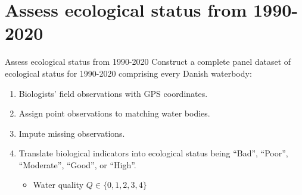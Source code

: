 \section{Assess ecological status from 1990-2020}

\begin{frame}{Assess ecological status from 1990-2020}
  Construct a complete panel dataset of ecological status for 1990-2020 comprising every Danish waterbody\pause:
  \begin{enumerate}
    \item Biologists' field observations with GPS coordinates.
    \pause
    \item Assign point observations to matching water bodies.
    \pause
    \item Impute missing observations.
    \pause
    \item Translate biological indicators into ecological status being “Bad”, “Poor”, “Moderate”, “Good”, or “High”.
    \begin{itemize}\normalsize
      \item Water quality $Q\in\{0,1,2,3,4\}$
    \end{itemize}
  \end{enumerate}
\end{frame}
